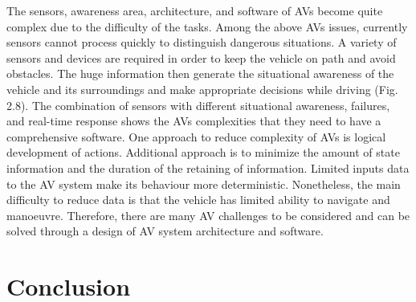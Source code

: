 \documentclass[10pt,oneside,english,a4paper]{article}
\begin{document}
The sensors, awareness area, architecture, and software of AVs become quite complex due to the difficulty of the tasks. Among the above AVs issues, currently sensors cannot process quickly to distinguish dangerous situations. A variety of sensors and devices are required in order to keep the vehicle on path and avoid obstacles. The huge information then generate the situational awareness of the vehicle and its surroundings and make appropriate decisions while driving (Fig. 2.8). The combination of sensors with different situational awareness, failures, and real-time response shows the AVs complexities that they need to have a comprehensive software. One approach to reduce complexity of AVs is logical development of actions. Additional approach is to minimize the amount of state information and the duration of the retaining of information. Limited inputs data to the AV system make its behaviour more deterministic. Nonetheless, the main difficulty to reduce data is that the vehicle has limited ability to navigate and manoeuvre. Therefore, there are many AV challenges to be considered and can be solved through a design of AV system architecture and software.



\section{Conclusion} \label{conclusion}





\newpage

\end{document}
